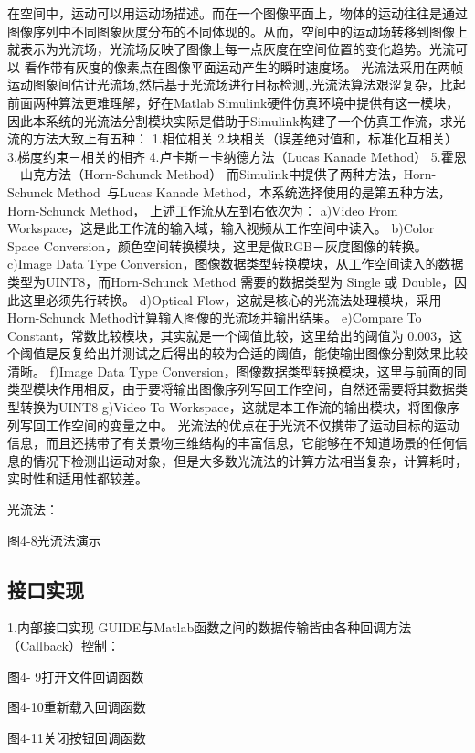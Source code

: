 \documentclass[18pt, twoside, a4paper, dvipdfm]{book}
\begin{document}
在空间中，运动可以用运动场描述。而在一个图像平面上，物体的运动往往是通过图像序列中不同图象灰度分布的不同体现的。从而，空间中的运动场转移到图像上就表示为光流场，光流场反映了图像上每一点灰度在空间位置的变化趋势。光流可以
看作带有灰度的像素点在图像平面运动产生的瞬时速度场。
光流法采用在两帧运动图象间估计光流场,然后基于光流场进行目标检测,.光流法算法艰涩复杂，比起前面两种算法更难理解，好在Matlab Simulink硬件仿真环境中提供有这一模块，因此本系统的光流法分割模块实际是借助于Simulink构建了一个仿真工作流，求光流的方法大致上有五种：
1.相位相关
2.块相关（误差绝对值和，标准化互相关）
3.梯度约束－相关的相齐
4.卢卡斯－卡纳德方法（Lucas Kanade Method）
5.霍恩－山克方法（Horn-Schunck Method）
而Simulink中提供了两种方法，Horn-Schunck Method 与Lucas Kanade Method，本系统选择使用的是第五种方法，Horn-Schunck Method，
上述工作流从左到右依次为：
a)Video From Workspace，这是此工作流的输入域，输入视频从工作空间中读入。
b)Color Space Conversion，颜色空间转换模块，这里是做RGB－灰度图像的转换。
c)Image Data Type Conversion，图像数据类型转换模块，从工作空间读入的数据类型为UINT8，而Horn-Schunck Method 需要的数据类型为 Single 或 Double，因此这里必须先行转换。
d)Optical Flow，这就是核心的光流法处理模块，采用Horn-Schunck Method计算输入图像的光流场并输出结果。
e)Compare To Constant，常数比较模块，其实就是一个阈值比较，这里给出的阈值为 0.003，这个阈值是反复给出并测试之后得出的较为合适的阈值，能使输出图像分割效果比较清晰。
f)Image Data Type Conversion，图像数据类型转换模块，这里与前面的同类型模块作用相反，由于要将输出图像序列写回工作空间，自然还需要将其数据类型转换为UINT8
g)Video To Workspace，这就是本工作流的输出模块，将图像序列写回工作空间的变量之中。
光流法的优点在于光流不仅携带了运动目标的运动信息，而且还携带了有关景物三维结构的丰富信息，它能够在不知道场景的任何信息的情况下检测出运动对象，但是大多数光流法的计算方法相当复杂，计算耗时，实时性和适用性都较差。

光流法：
 

图4-8光流法演示

\subsection{接口实现}
1.内部接口实现
GUIDE与Matlab函数之间的数据传输皆由各种回调方法（Callback）控制：

 

图4- 9打开文件回调函数

 

图4-10重新载入回调函数

 

图4-11关闭按钮回调函数
\end{document}
